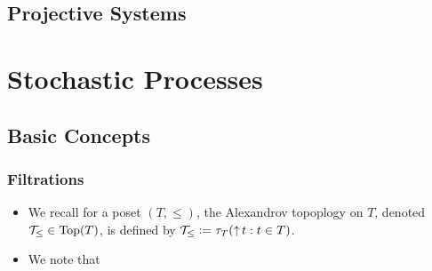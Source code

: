 \documentclass{book}
\begin{document}
	
	
	
	
	
	
	
	
	
	
	
	
	
	
	
	
	
	
	
	
	
	
	
	
	
	
	
	
	
	
	
	
	
	\newpage
	\chapter{Projective Systems}
	
	
	
	
	
	
	
	
	
	
	
	
	
	
	
	
	
	
	
	
	
	
	
	
	
	
	
	\newpage
	\part{Stochastic Processes}
	
	\chapter{Basic Concepts}
	
	\section{Filtrations}
	
	
	\begin{note}
		\begin{itemize}
			\item We recall for a poset $(T, \leq)$, the Alexandrov topoplogy on $T$, denoted $\mathcal{T}_{\leq} \in \operatorname*{\text{Top}}(T)$, is defined by $\mathcal{T}_{\leq} \vcentcolon= \tau_T(\operatorname{\uparrow} t: t \in T)$.  
			\item We note that 
		\end{itemize}
	\end{note}
	
\end{document}

